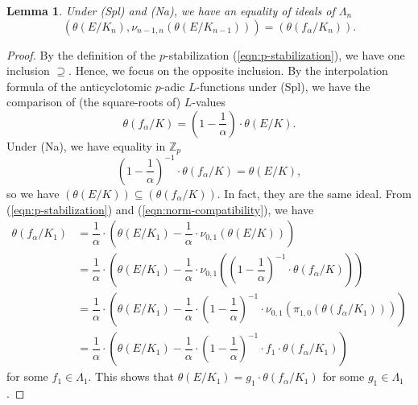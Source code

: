 \documentclass[11pt]{amsart}
\numberwithin{equation}{section}
\newtheorem{lem}[thm]{Lemma}
\theoremstyle{definition}
\begin{document}
\begin{lem} \label{lem:p-stabilization}
Under (Spl) and (Na), we have an equality of ideals of $\Lambda_n$
 $$\left( \theta(E/K_n) , \nu_{n-1, n} \left( \theta(E/K_{n-1}) \right) \right) = \left(  \theta(f_\alpha/K_{n}) \right)  .$$
\end{lem}
\begin{proof}
By the definition of the $p$-stabilization (\ref{eqn:p-stabilization}), we have one inclusion $\supseteq$.
Hence, we focus on the opposite inclusion.
By the interpolation formula of the anticyclotomic $p$-adic $L$-functions \cite[Thm. A]{chida-hsieh-p-adic-L-functions} under (Spl), we have the comparison of (the square-roots of) $L$-values
$$\theta(f_\alpha/K) = \left( 1 - \dfrac{1}{\alpha} \right) \cdot \theta(E/K).$$
Under (Na), we have equality in $\mathbb{Z}_p$
$$\left( 1 - \dfrac{1}{\alpha} \right)^{-1} \cdot \theta(f_\alpha/K) = \theta(E/K),$$
so we have  $(\theta(E/K)) \subseteq (\theta(f_\alpha/K))$. In fact, they are the same ideal.
From (\ref{eqn:p-stabilization}) and (\ref{eqn:norm-compatibility}), we have
\begin{align*}
\theta(f_\alpha/K_1) & = \dfrac{1}{\alpha} \cdot \left(  \theta(E/K_1) - \dfrac{1}{\alpha} \cdot \nu_{0, 1}( \theta(E/K) )  \right) \\
& =  \dfrac{1}{\alpha} \cdot \left(  \theta(E/K_1) - \dfrac{1}{\alpha} \cdot \nu_{0, 1}( \left( 1 - \dfrac{1}{\alpha} \right)^{-1} \cdot \theta(f_\alpha/K) )  \right) \\
& = \dfrac{1}{\alpha} \cdot \left(  \theta(E/K_1) - \dfrac{1}{\alpha} \cdot \left( 1 - \dfrac{1}{\alpha} \right)^{-1} \cdot \nu_{0, 1}(  \pi_{1,0} ( \theta(f_\alpha/K_1)) )  \right) \\
& = \dfrac{1}{\alpha} \cdot \left(  \theta(E/K_1) - \dfrac{1}{\alpha} \cdot \left( 1 - \dfrac{1}{\alpha} \right)^{-1} \cdot f_1 \cdot \theta(f_\alpha/K_1)   \right)
\end{align*}
for some $f_1 \in \Lambda_1$. This shows that
$\theta(E/K_{1}) = g_{1} \cdot \theta(f_\alpha/K_{1})$
for some $g_{1} \in \Lambda_{1}$.


\end{proof}
\end{document}
